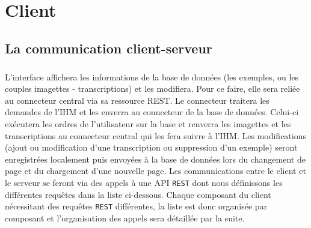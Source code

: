 \chapter{Client}

\section{La communication client-serveur}

\paragraph{}
L’interface affichera les informations de la base de données (les exemples, ou les couples imagettes - transcriptions) et les modifiera. Pour ce faire, elle sera reliée au connecteur central via sa ressource REST. Le connecteur traitera les demandes de l’IHM et les enverra au connecteur de la base de données. Celui-ci exécutera les ordres de l’utilisateur sur la base et renverra les imagettes et les transcriptions au connecteur central qui les fera suivre à l’IHM. Les modifications (ajout ou modification d’une transcription ou suppression d’un exemple) seront enregistrées localement puis envoyées à la base de données lors du changement de page et du chargement d'une nouvelle page.
\newline{}
Les communications entre le client et le serveur se feront via des appels à une API \texttt{REST} dont nous définissons les différentes requêtes dans la liste ci-dessous. Chaque composant du client nécessitant des requêtes \texttt{REST} différentes, la liste est donc organisée par composant et l'organisation des appels sera détaillée par la suite.
\newline{}

